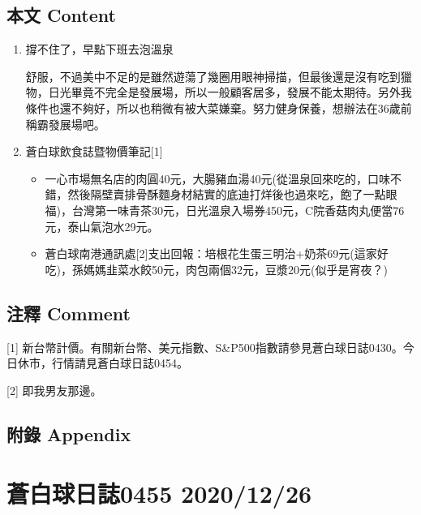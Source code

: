 \documentclass[
]{article}
\providecommand{\tightlist}{%
  \setlength{\itemsep}{0pt}\setlength{\parskip}{0pt}}
\begin{document}
\hypertarget{ux672cux6587-content-24}{%
\subsection{本文 Content}\label{ux672cux6587-content-24}}

\begin{enumerate}
\def\labelenumi{\arabic{enumi}.}
\item
  撐不住了，早點下班去泡溫泉

  舒服，不過美中不足的是雖然遊蕩了幾圈用眼神掃描，但最後還是沒有吃到獵物，日光畢竟不完全是發展場，所以一般顧客居多，發展不能太期待。另外我條件也還不夠好，所以也稍微有被大菜嫌棄。努力健身保養，想辦法在36歲前稱霸發展場吧。
\item
  蒼白球飲食誌暨物價筆記{[}1{]}

  \begin{itemize}
  \tightlist
  \item
    一心市場無名店的肉圓40元，大腸豬血湯40元(從溫泉回來吃的，口味不錯，然後隔壁賣排骨酥麵身材結實的底迪打烊後也過來吃，飽了一點眼福)，台灣第一味青茶30元，日光溫泉入場券450元，C院香菇肉丸便當76元，泰山氣泡水29元。
  \item
    蒼白球南港通訊處{[}2{]}支出回報：培根花生蛋三明治+奶茶69元(這家好吃)，孫媽媽韭菜水餃50元，肉包兩個32元，豆漿20元(似乎是宵夜？)
  \end{itemize}
\end{enumerate}

\hypertarget{ux6ce8ux91cb-comment-24}{%
\subsection{注釋 Comment}\label{ux6ce8ux91cb-comment-24}}

{[}1{]}
新台幣計價。有關新台幣、美元指數、S\&P500指數請參見蒼白球日誌0430。今日休市，行情請見蒼白球日誌0454。

{[}2{]} 即我男友那邊。

\hypertarget{ux9644ux9304-appendix-24}{%
\subsection{附錄 Appendix}\label{ux9644ux9304-appendix-24}}

\hypertarget{ux84bcux767dux7403ux65e5ux8a8c0455-20201226}{%
\section{蒼白球日誌0455
2020/12/26}\label{ux84bcux767dux7403ux65e5ux8a8c0455-20201226}}
\end{document}
